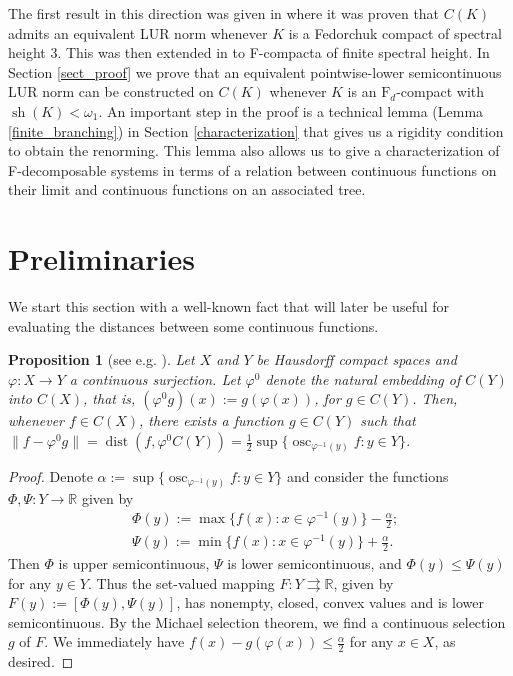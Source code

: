 \documentclass[11pt]{article}
\newcommand{\R}{\mathbb{R}}
\DeclareMathOperator{\osc}{osc}
\DeclareMathOperator{\dist}{dist}
\DeclareMathOperator{\sht}{sh}
\newtheorem{proposition}[theorem]{Proposition}
\theoremstyle{definition}
\theoremstyle{remark}
\begin{document}
The first result in this direction was given in \cite{gist} where it was proven that $C(K)$ admits an equivalent LUR norm whenever $K$ is a Fedorchuk compact of spectral height $3$. This was then extended in \cite{manev24} to F-compacta of finite spectral height. In Section \ref{sect_proof} we prove that an equivalent pointwise-lower semicontinuous LUR norm can be constructed on $C(K)$ whenever $K$ is an $\mathrm{F}_d$-compact with $\sht(K) < \omega_1$. An important step in the proof is a technical lemma (Lemma \ref{finite_branching}) in Section \ref{characterization} that gives us a rigidity condition to obtain the renorming. This lemma also allows us to give a characterization of F-decomposable systems in terms of a relation between continuous functions on their limit and continuous functions on an associated tree.

\section{Preliminaries}

We start this section with a well-known fact that will later be useful for evaluating the distances between some continuous functions.

\begin{proposition}[see e.g. {\cite[p. 173]{holmes_opt}}] \label{metr_proj}
	Let $X$ and $Y$ be Hausdorff compact spaces and $\varphi: X \to Y$ a continuous surjection. Let $\varphi^0$ denote the natural embedding of $C(Y)$ into $C(X)$, that is, $(\varphi^0 g)(x) := g(\varphi(x))$, for $g \in C(Y)$. Then, whenever $f \in C(X)$, there exists a function $g \in C(Y)$ such that $\|f- \varphi^0 g\| = \dist(f, \varphi^0 C(Y)) = \frac{1}{2} \sup \{\osc_{\varphi^{-1}(y)} f: y \in Y\}$.
\end{proposition}

\begin{proof}
	Denote $\alpha := \sup \{\osc_{\varphi^{-1}(y)} f: y \in Y\}$ and consider the functions $\Phi, \Psi: Y \to \R$ given by 
	\begin{align*}
		&\Phi(y) := \max\{f(x): x \in \varphi^{-1}(y)\} - \frac{\alpha}{2};\\
		&\Psi(y) := \min\{f(x): x \in \varphi^{-1}(y)\} + \frac{\alpha}{2}.
	\end{align*}
	Then $\Phi$ is upper semicontinuous, $\Psi$ is lower semicontinuous, and $\Phi(y) \leq \Psi(y)$ for any $y \in Y$. Thus the set-valued mapping $F : Y \rightrightarrows \R$, given by $F(y) := [\Phi(y), \Psi(y)]$, has nonempty, closed, convex values and is lower semicontinuous. By the Michael selection theorem, we find a continuous selection $g$ of $F$. We immediately have $f(x) - g(\varphi(x)) \leq \frac{\alpha}{2}$ for any $x \in X$, as desired.
\end{proof}
\end{document}
